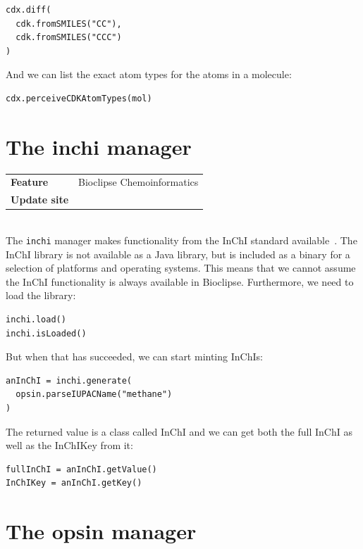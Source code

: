 \documentclass{book}
\begin{document}
\begin{refsection}
\begin{Verbatim}
cdx.diff(
  cdk.fromSMILES("CC"),
  cdk.fromSMILES("CCC")
)
\end{Verbatim}

And we can list the exact atom types for the atoms in a
molecule:

\begin{Verbatim}
cdx.perceiveCDKAtomTypes(mol)
\end{Verbatim}

\section{The inchi manager}

\begin{tabular}{ll}
\textbf{Feature} & Bioclipse Chemoinformatics \\
\textbf{Update site} & \url{} \\
\end{tabular} \\

The \texttt{inchi} manager makes functionality from the InChI
standard
available~\cite{heller2013inchi,spjuth2013applications}.
The InChI library is not available as a Java library, but is
included as a binary for a selection of platforms and operating
systems. This means that we cannot assume the InChI
functionality is always available in Bioclipse. Furthermore,
we need to load the library:

\begin{Verbatim}
inchi.load()
inchi.isLoaded()
\end{Verbatim}

But when that has succeeded, we can start minting
InChIs:

\begin{Verbatim}
anInChI = inchi.generate(
  opsin.parseIUPACName("methane")
)
\end{Verbatim}

The returned value is a class called InChI and we can get both
the full InChI as well as the InChIKey from it:

\begin{Verbatim}
fullInChI = anInChI.getValue()
InChIKey = anInChI.getKey()
\end{Verbatim}

\section{The opsin manager}


\end{refsection}
\end{document}
